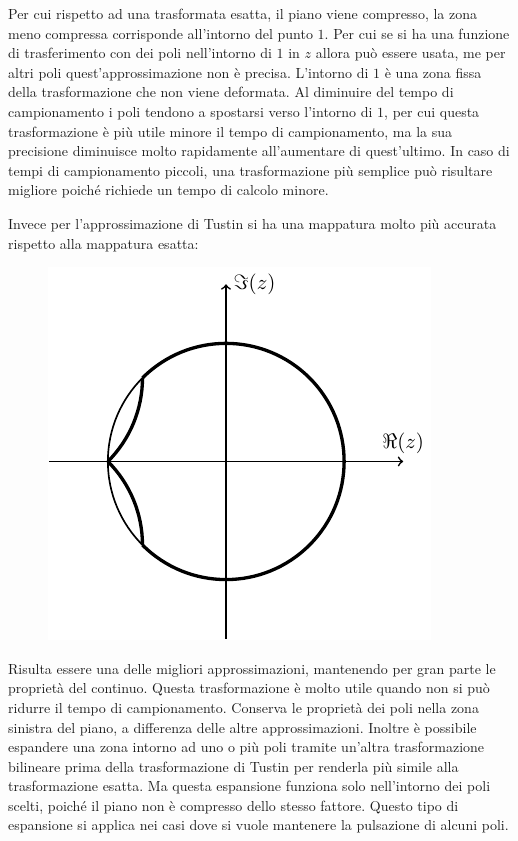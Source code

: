 \documentclass{article}
\numberwithin{equation}{subsection}
\begin{document}
Per cui rispetto ad una trasformata esatta, il piano viene compresso, la zona meno compressa corrisponde all'intorno del punto $1$. Per cui se si ha una 
funzione di trasferimento con dei poli nell'intorno di $1$ in $z$ allora può essere usata, me per altri poli quest'approssimazione non è precisa. 
L'intorno di $1$ è una zona fissa della trasformazione che non viene deformata. Al diminuire del tempo di campionamento i poli tendono a spostarsi verso l'intorno di $1$, 
per cui questa trasformazione è più utile minore il tempo di campionamento, ma la sua precisione diminuisce molto rapidamente all'aumentare di quest'ultimo. 
In caso di tempi di campionamento piccoli, una trasformazione più semplice può risultare migliore poiché richiede un tempo di calcolo minore. 

Invece per l'approssimazione di Tustin si ha una mappatura molto più accurata rispetto alla mappatura esatta:
\begin{figure}[H]%
    \centering
    \includegraphics{piano-z-3.pdf}%
\end{figure}
Risulta essere una delle migliori approssimazioni, mantenendo per gran parte le proprietà del continuo. Questa trasformazione è molto utile quando non si può ridurre il 
tempo di campionamento. Conserva le proprietà dei poli nella zona sinistra del piano, a differenza delle altre approssimazioni. Inoltre è possibile espandere una zona 
intorno ad uno o più poli tramite un'altra trasformazione bilineare prima della trasformazione di Tustin per renderla più simile alla trasformazione esatta. Ma questa 
espansione funziona solo nell'intorno dei poli scelti, poiché il piano non è compresso dello stesso fattore. Questo tipo di espansione si applica nei casi dove si 
vuole mantenere la pulsazione di alcuni poli. 
\end{document}
